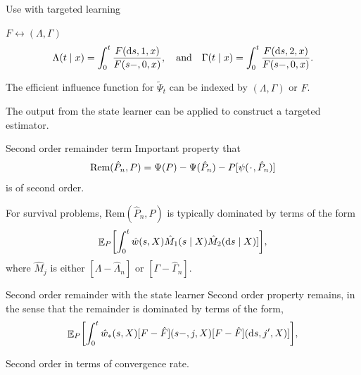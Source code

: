 \documentclass[smaller]{beamer}\usepackage{listings}
\begin{document}
\begin{frame}[label={sec:org7a41b07}]{Use with targeted learning}
\begin{block}{\centering \(F \longleftrightarrow (\Lambda, \Gamma)\)}
\begin{equation*}
  \Lambda(t \mid x) = \int_0^t \frac{F(\mathop{}\!\mathrm{d} s, 1, x)}{F(s-, 0, x)} ,
  \quad \text{and} \quad
  \Gamma(t \mid x) = \int_0^t \frac{F(\mathop{}\!\mathrm{d} s, 2, x)}{F(s-, 0, x)} .
\end{equation*}
\end{block}

\begin{block}{}
The efficient influence function for \(\tilde{\Psi}_t\) can be indexed by
\((\Lambda, \Gamma)\) or \(F\).
\end{block}

\begin{block}{}
The output from the state learner can be applied to construct a targeted
estimator.
\end{block}
\end{frame}

\begin{frame}[label={sec:org8a1315d}]{Second order remainder term}
Important property that
\begin{equation*}
  \text{Rem}(\hat{P}_n, P) = \Psi(P) - \Psi(\hat{P}_n) - P{[
    \psi(\blank, \hat{P}_n)]}
\end{equation*}
is of second order.

\vfill

For survival problems, \( \text{Rem}(\hat{P}_n, P) \) is typically dominated
by terms of the form
\begin{equation*}  
  {\ensuremath{\mathop{{\mathbb{E}}}}}_P{\left[ \int_0^t \hat{w}(s, X) \hat{M}_1(s \mid X)  \hat{M}_2(\mathop{}\!\mathrm{d} s \mid X)] \right]},
\end{equation*}
where \( \hat{M}_j \) is either \( [\Lambda - \hat{\Lambda}_n] \) or
\( [\Gamma - \hat{\Gamma}_n ]\).
\end{frame}



\begin{frame}[label={sec:orgccfb162}]{Second order remainder with the state learner}
Second order property remains, in the sense that the remainder is dominated by
terms of the form,
\begin{equation*}  
  {\ensuremath{\mathop{{\mathbb{E}}}}}_P{\left[ \int_0^t
      \hat{w}_*(s, X) [F - \hat{F}](s-, j, X)  [F- \hat{F}](\mathop{}\!\mathrm{d} s, j', X)] \right]},
\end{equation*}

\vfill

Second order in terms of convergence rate.
\end{frame}
\end{document}
